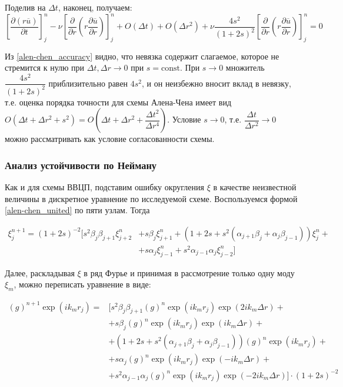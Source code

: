 Поделив на $\Delta t$, наконец, получаем:
\begin{equation} \label{alen-chen_accuracy}
	\left[ \dfrac{\partial (r\overline{u})}{\partial t} \right]_j^n - \nu \left[ \dfrac{\partial}{\partial r} \left( r \dfrac{\partial \overline{u}}{\partial r} \right) \right]_j^n + O(\Delta t) + O(\Delta r^2) + \nu \dfrac{4s^2}{(1+2s)^2} \left[ \dfrac{\partial}{\partial r} \left( r \dfrac{\partial \overline{u}}{\partial r} \right) \right]_j^n = 0
\end{equation}

Из \eqref{alen-chen_accuracy} видно, что невязка содержит слагаемое, которое не стремится к нулю при $\Delta t, \Delta r \to 0$ при $s = \text{const}$. При $s \to 0$ множитель $ \dfrac{4s^2}{(1+2s)^2} $ приблизительно равен $4s^2$, и он неизбежно вносит вклад в невязку, т.е. оценка порядка точности для схемы Алена-Чена имеет вид $O\left(\Delta t + \Delta r^2 + s^2 \right) = O\left(\Delta t + \Delta r^2 + \dfrac{\Delta t^2}{\Delta r^4} \right)$. Условие $s \to 0$, т.е. $\dfrac{\Delta t}{\Delta r^2} \to 0$ можно рассматривать как условие согласованности схемы.



\subsubsection{Анализ устойчивости по Нейману}

Как и для схемы ВВЦП, подставим ошибку округления $\xi$ в качестве неизвестной величины в дискретное уравнение по исследуемой схеме. Воспользуемся формой \eqref{alen-chen_united} по пяти узлам. Тогда

\begin{equation} \label{eq:alen-chen_xi}
\begin{split}
	\xi_j^{n+1} = (1+2s)^{-2} \biggl[ s^2 \beta_j \beta_{j+1} \xi_{j+2}^n &+ s \beta_j \xi_{j+1}^n + \left( 1 + 2s + s^2 \left( \alpha_{j+1}\beta_j + \alpha_j \beta_{j-1} \right) \right) \xi_j^n + \\
	&+ s \alpha_j \xi_{j-1}^n + s^2 \alpha_{j-1} \alpha_j \xi_{j-2}^n \biggr]
\end{split}
\end{equation}

Далее, раскладывая $\xi$ в ряд Фурье и принимая в рассмотрение только одну моду $\xi_m$, можно переписать уравнение в виде:

\begin{equation} \label{eq:alen-chen_g_eq}
\begin{split}
	(g)^{n+1} \exp(i k_m r_j) = &\biggl[ s^2 \beta_j \beta_{j+1} (g)^n \exp(i k_m r_j) \exp(2i k_m \Delta r) + \\
	& + s \beta_j (g)^n \exp(i k_m r_j) \exp(i k_m \Delta r) + \\ & + \left( 1 + 2s + s^2 \left( \alpha_{j+1}\beta_j + \alpha_j \beta_{j-1} \right) \right) (g)^n \exp(i k_m r_j) + \\
	& + s \alpha_j (g)^n \exp(i k_m r_j) \exp(- i k_m \Delta r) + \\
	& +  s^2 \alpha_{j-1} \alpha_j (g)^n \exp(i k_m r_j) \exp(-2i k_m \Delta r) \biggr] \cdot (1+2s)^{-2} 
\end{split}
\end{equation}

